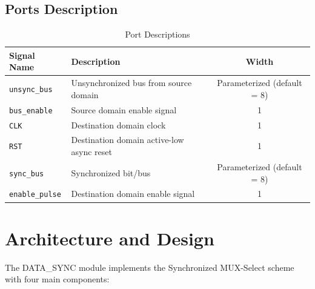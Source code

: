 \documentclass[12pt,a4paper]{article}
\begin{document}
\subsection{Ports Description}
\begin{table}[H]
\centering
\begin{tabular}{@{}llc@{}}
\toprule
\textbf{Signal Name} & \textbf{Description} & \textbf{Width} \\
\midrule
\texttt{unsync\_bus}   & Unsynchronized bus from source domain & Parameterized (default = 8) \\
\texttt{bus\_enable}   & Source domain enable signal            & 1 \\
\texttt{CLK}           & Destination domain clock               & 1 \\
\texttt{RST}           & Destination domain active-low async reset & 1 \\
\texttt{sync\_bus}     & Synchronized bit/bus                  & Parameterized (default = 8) \\
\texttt{enable\_pulse} & Destination domain enable signal      & 1 \\
\bottomrule
\end{tabular}
\caption{Port Descriptions}
\end{table}

\section{Architecture and Design}

The DATA\_SYNC module implements the Synchronized MUX-Select scheme with four main components:
\end{document}
